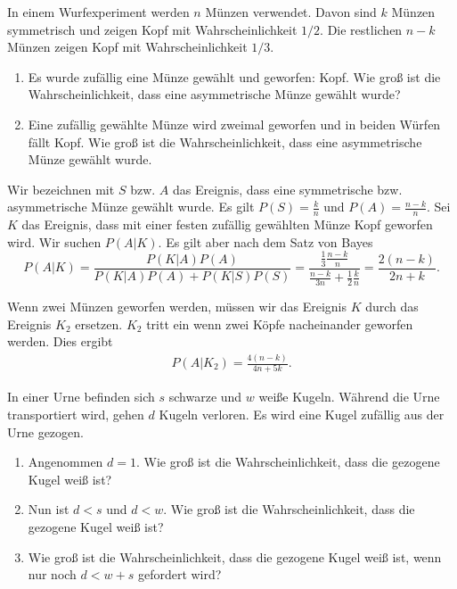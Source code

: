 In einem Wurfexperiment werden $n$ Münzen verwendet. Davon sind $k$ Münzen
symmetrisch und zeigen Kopf mit Wahrscheinlichkeit $1/2$. Die restlichen $n-k$
Münzen zeigen Kopf mit Wahrscheinlichkeit $1/3$. 
\begin{enumerate}
    \item Es wurde zufällig eine Münze gewählt und geworfen: Kopf. Wie groß ist 
        die Wahrscheinlichkeit, dass eine asymmetrische Münze gewählt wurde?
    \item Eine zufällig gewählte Münze wird zweimal geworfen und in beiden 
        Würfen fällt Kopf. Wie groß ist die Wahrscheinlichkeit, dass eine asymmetrische
        Münze gewählt wurde. 
\end{enumerate}

\solution Wir bezeichnen mit $S$ bzw. $A$ das Ereignis, dass eine
symmetrische bzw. asymmetrische Münze gewählt wurde. Es gilt $P(S) = \frac{k}{n}$
und $P(A)=\frac{n-k}{n}$. Sei $K$ das Ereignis, dass mit einer festen zufällig
gewählten Münze Kopf geworfen wird. Wir suchen $P(A | K)$. Es gilt aber nach dem
Satz von Bayes
\begin{equation*}
    P( A | K) = \frac{ P( K | A) P(A) }{ P(K | A) P(A) + P(K | S) P(S) }
    = \frac{\frac{1}{3} \frac{n-k}{n} }{ \frac{n-k}{3 n} + \frac{1}{2} \frac{k}{n}} 
    = \frac{2(n-k)}{2n + k}.
\end{equation*}

Wenn zwei Münzen geworfen werden, müssen wir das Ereignis $K$ durch das Ereignis $K_2$ ersetzen. 
$K_2$ tritt ein wenn zwei Köpfe nacheinander geworfen werden. Dies ergibt
\begin{align*}
    P\left( A | K_{2} \right) = \frac{4(n-k)}{4n + 5k}. 
\end{align*}




 In einer Urne befinden
sich $s$ schwarze und $w$ weiße Kugeln. Während die Urne transportiert wird,
gehen $d$ Kugeln verloren. Es wird eine Kugel zufällig aus der Urne gezogen.
\begin{enumerate}
    \item Angenommen $d=1$. Wie groß ist die Wahrscheinlichkeit, dass die
        gezogene Kugel weiß ist?
    \item Nun ist $d<s$ und $d<w$. Wie groß ist die Wahrscheinlichkeit, dass die
        gezogene Kugel weiß ist?
    \item Wie groß ist die Wahrscheinlichkeit, dass die gezogene Kugel weiß
        ist, wenn nur noch $d<w+s$ gefordert wird?
\end{enumerate}

